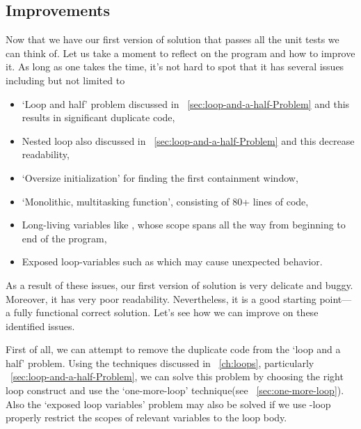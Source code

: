 \subsection{Improvements}
Now that we have our first version of solution that passes all the unit tests we can think of.
Let us take a moment to reflect on the program and how to improve it.
As long as one takes the time, it's not hard to spot that
it has several issues including but not limited to
\begin{itemize}
    \item `Loop and half' problem discussed in ~\autoref{sec:loop-and-a-half-Problem} and this
    results in significant duplicate code,
    \item Nested loop also discussed in ~\autoref{sec:loop-and-a-half-Problem} and this
    decrease readability,
    \item `Oversize initialization' for finding the first containment window,
    \item `Monolithic, multitasking function', consisting of 80+ lines of code,
    \item Long-living variables like , whose scope spans all the way from
    beginning to end of the program,
    \item Exposed loop-variables such as  which may cause unexpected behavior.
\end{itemize}
As a result of these issues, our first version of solution is very delicate and buggy.
Moreover, it has very poor readability.
Nevertheless, it is a good starting point---a fully functional correct solution.
Let's see how we can improve on these identified issues.

First of all, we can attempt to remove the duplicate code from the `loop and a half' problem.
Using the techniques discussed in ~\autoref{ch:loops}, particularly
~\autoref{sec:loop-and-a-half-Problem}, we can solve this problem by choosing the right loop
construct and use the `one-more-loop' technique(see ~\autoref{sec:one-more-loop}).
Also the `exposed loop variables' problem may also be solved if we use -loop properly
restrict the scopes of relevant variables to the loop body.

